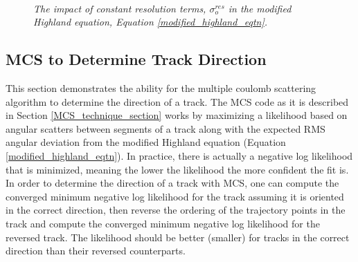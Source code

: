 \begin{figure}
\centering
\mbox{
	\quad
	}
\caption{\textit{The impact of constant resolution terms, $\sigma_o^{res}$ in the modified Highland equation, Equation \ref{modified_highland_eqtn}.}}
\end{figure}


\subsection{MCS to Determine Track Direction}\label{TrackDirection_MCBNBRecoTrack_section}
This section demonstrates the ability for the multiple coulomb scattering algorithm to determine the direction of a track. The MCS code as it is described in Section \ref{MCS_technique_section} works by maximizing a likelihood based on angular scatters between segments of a track along with the expected RMS angular deviation from the modified Highland equation (Equation \ref{modified_highland_eqtn}). In practice, there is actually a negative log likelihood that is minimized, meaning the lower the likelihood the more confident the fit is. In order to determine the direction of a track with MCS, one can compute the converged minimum negative log likelihood for the track assuming it is oriented in the correct direction, then reverse the ordering of the trajectory points in the track and compute the converged minimum negative log likelihood for the reversed track. The likelihood should be better (smaller) for tracks in the correct direction than their reversed counterparts.\\

